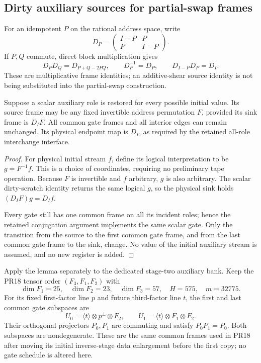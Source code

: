 \subsection{Dirty auxiliary sources for partial-swap frames}
\label{sec:partial-swap-source-extension}

For an idempotent $P$ on the rational address space, write
\[
 D_P=\begin{pmatrix}I-P&P\\P&I-P\end{pmatrix}.
\]
If $P,Q$ commute, direct block multiplication gives
\[
 D_PD_Q=D_{P+Q-2PQ},\qquad D_P^{-1}=D_P,
 \qquad D_{I-P}D_P=D_I.
\]
These are multiplicative frame identities; an additive-shear source
identity is not being substituted into the partial-swap construction.

\begin{lemma}
Suppose a scalar auxiliary role is restored for every possible initial
value.  Its source frame may be any fixed invertible address permutation
$F$, provided its sink frame is $D_IF$.  All common gate frames and all
interior edges can remain unchanged.  Its physical endpoint map is $D_I$,
as required by the retained all-role interchange interface.
\end{lemma}
\begin{proof}
For physical initial stream $f$, define its logical interpretation to
be $g=F^{-1}f$.  This is a choice of coordinates, requiring no preliminary
tape operation.  Because $F$ is invertible and $f$ arbitrary, $g$ is also
arbitrary.  The scalar dirty-scratch identity returns the same logical
$g$, so the physical sink holds $(D_IF)g=D_If$.

Every gate still has one common frame on all its incident roles; hence
the retained conjugation argument implements the same scalar gate.
Only the transition from the source to the first common gate frame,
and from the last common gate frame to the sink, change.  No value of
the initial auxiliary stream is assumed, and no new register is added.
\end{proof}

Apply the lemma separately to the dedicated stage-two auxiliary bank.
Keep the PR18 tensor order $(F_3,F_1,F_2)$ with
\[
 \dim F_1=25,\quad \dim F_2=23,\quad\dim F_3=57,
 \quad H=575,\quad m=32775.
\]
For its fixed first-factor line $p$ and future third-factor line $t$,
the first and last common gate subspaces are
\[
 U_0=\langle t\rangle\otimes p^\perp\otimes F_2,
 \qquad U_1=\langle t\rangle\otimes F_1\otimes F_2.
\]
Their orthogonal projectors $P_0,P_1$ are commuting and satisfy
$P_0P_1=P_0$.  Both subspaces are nondegenerate.  These are the same
common frames used in PR18 after moving its initial inverse-stage data
enlargement before the first copy; no gate schedule is altered here.

